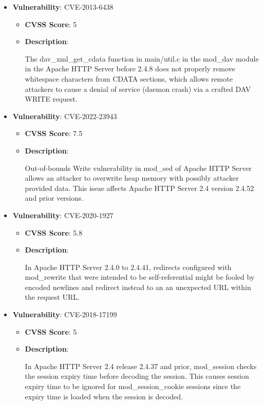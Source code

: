 \documentclass{article}
\begin{document}
\begin{itemize}
        \item \textbf{Vulnerability}: CVE-2013-6438
        \begin{itemize}
            \item \textbf{CVSS Score}:  5 
            \item \textbf{Description}:
            \parbox[t]{0.9\linewidth}{
                \ttfamily The dav\_xml\_get\_cdata function in main/util.c in the mod\_dav module in the Apache HTTP Server before 2.4.8 does not properly remove whitespace characters from CDATA sections, which allows remote attackers to cause a denial of service (daemon crash) via a crafted DAV WRITE request.
            }
        \end{itemize}
    
        \item \textbf{Vulnerability}: CVE-2022-23943
        \begin{itemize}
            \item \textbf{CVSS Score}:  7.5 
            \item \textbf{Description}:
            \parbox[t]{0.9\linewidth}{
                \ttfamily Out-of-bounds Write vulnerability in mod\_sed of Apache HTTP Server allows an attacker to overwrite heap memory with possibly attacker provided data. This issue affects Apache HTTP Server 2.4 version 2.4.52 and prior versions.
            }
        \end{itemize}
    
        \item \textbf{Vulnerability}: CVE-2020-1927
        \begin{itemize}
            \item \textbf{CVSS Score}:  5.8 
            \item \textbf{Description}:
            \parbox[t]{0.9\linewidth}{
                \ttfamily In Apache HTTP Server 2.4.0 to 2.4.41, redirects configured with mod\_rewrite that were intended to be self-referential might be fooled by encoded newlines and redirect instead to an an unexpected URL within the request URL.
            }
        \end{itemize}
    
        \item \textbf{Vulnerability}: CVE-2018-17199
        \begin{itemize}
            \item \textbf{CVSS Score}:  5 
            \item \textbf{Description}:
            \parbox[t]{0.9\linewidth}{
                \ttfamily In Apache HTTP Server 2.4 release 2.4.37 and prior, mod\_session checks the session expiry time before decoding the session. This causes session expiry time to be ignored for mod\_session\_cookie sessions since the expiry time is loaded when the session is decoded.
            }
        \end{itemize}
    

\end{itemize}
\end{document}
